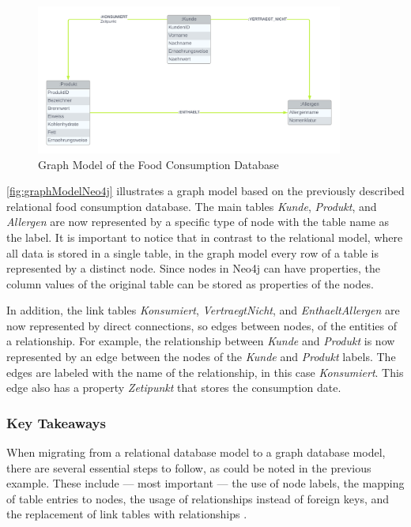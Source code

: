 \begin{figure}[H]
    \centering
    \caption{Graph Model of the Food Consumption Database}\label{fig:graphModelNeo4j}
    \includegraphics[width=0.9\textwidth]{images/neo4j_example_graph_model.png}
\end{figure}

\autoref{fig:graphModelNeo4j} illustrates a graph model based on the previously described relational food consumption database. The main tables \textit{Kunde}, \textit{Produkt}, and \textit{Allergen} are now represented by a specific type of node with the table name as the label. It is important to notice that in contrast to the relational model, where all data is stored in a single table, in the graph model every row of a table is represented by a distinct node. Since nodes in Neo4j can have properties, the column values of the original table can be stored as properties of the nodes.

In addition, the link tables \textit{Konsumiert}, \textit{VertraegtNicht}, and \textit{EnthaeltAllergen} are now represented by direct connections, so edges between nodes, of the entities of a relationship. For example, the relationship between \textit{Kunde} and \textit{Produkt} is now represented by an edge between the nodes of the \textit{Kunde} and \textit{Produkt} labels. The edges are labeled with the name of the relationship, in this case \textit{Konsumiert}. This edge also has a property \textit{Zetipunkt} that stores the consumption date.

\subsubsection*{Key Takeaways}

When migrating from a relational database model to a graph database model, there are several essential steps to follow, as could be noted in the previous example. These include --- most important --- the use of node labels, the mapping of table entries to nodes, the usage of relationships instead of foreign keys, and the replacement of link tables with relationships \parencite{neo4j_docs_migration}.

